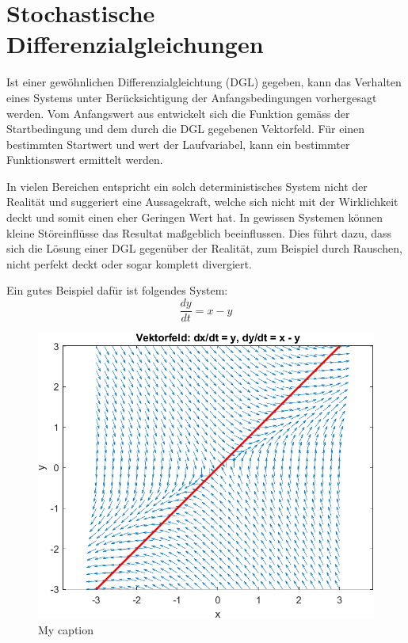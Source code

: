 %
%
%
%
\section{Stochastische Differenzialgleichungen\label{brown:SDGL}}

Ist einer gewöhnlichen Differenzialgleichtung (DGL) gegeben, kann das Verhalten eines Systems unter Berücksichtigung der Anfangsbedingungen vorhergesagt werden. Vom Anfangswert aus entwickelt sich die Funktion gemäss der Startbedingung und dem durch die DGL gegebenen Vektorfeld. Für einen bestimmten Startwert und wert der Laufvariabel, kann ein bestimmter Funktionswert ermittelt werden.

In vielen Bereichen entspricht ein solch deterministisches System  nicht der Realität und suggeriert eine Aussagekraft, welche sich nicht mit der Wirklichkeit deckt und somit einen eher Geringen Wert hat. In gewissen Systemen können kleine Störeinflüsse das Resultat maßgeblich beeinflussen. Dies führt dazu, dass sich die Lösung einer DGL  gegenüber der Realität, zum Beispiel durch Rauschen, nicht perfekt deckt oder sogar komplett divergiert.

Ein gutes Beispiel dafür ist folgendes System:
\begin{equation}
	\frac{dy}{dt} = x - y
\end{equation}

\begin{figure}
	\centering
	\includegraphics[width=\linewidth]{papers/brown/images/vektorfeld_01.png}
	\caption{My caption}
\end{figure}

